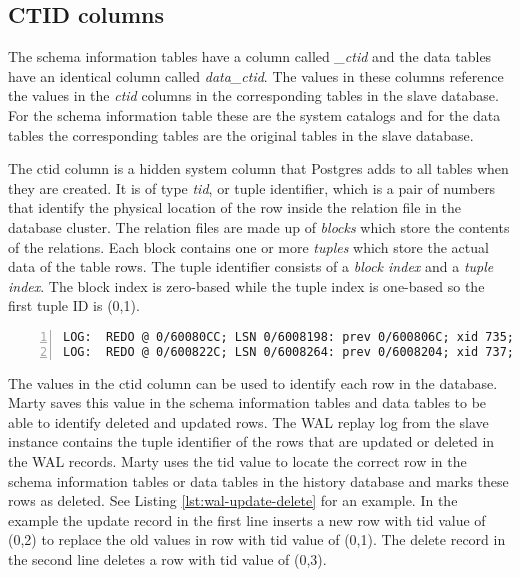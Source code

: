 \subsection{CTID columns}
\label{ch:implementation-history-ctid}
The schema information tables have a column called \textit{\_ctid} and the data tables have an identical column called \textit{data\_ctid}.
The values in these columns reference the values in the \textit{ctid} columns in the corresponding tables in the slave database.
For the schema information table these are the system catalogs and for the data tables the corresponding tables are the original tables in the slave database.

The ctid column is a hidden system column that Postgres adds to all tables when they are created.
It is of type \textit{tid}, or tuple identifier, which is a pair of numbers that identify the physical location of the row inside the relation file in the database cluster.
The relation files are made up of \textit{blocks} which store the contents of the relations.
Each block contains one or more \textit{tuples} which store the actual data of the table rows.
The tuple identifier consists of a \textit{block index} and a \textit{tuple index}.
The block index is zero-based while the tuple index is one-based so the first tuple ID is (0,1).

\begin{lstlisting}[caption={WAL update and delete example},label={lst:wal-update-delete},numbers=left,xleftmargin=2em]
LOG:  REDO @ 0/60080CC; LSN 0/6008198: prev 0/600806C; xid 735; len 37; bkpb0: Heap - update: rel 1663/16384/16385; tid 0/1 xmax 735 ; new tid 0/2 xmax 0
LOG:  REDO @ 0/600822C; LSN 0/6008264: prev 0/6008204; xid 737; len 26: Heap - delete: rel 1663/16384/16385; tid 0/3 KEYS_UPDATED
\end{lstlisting}

The values in the ctid column can be used to identify each row in the database.
Marty saves this value in the schema information tables and data tables to be able to identify deleted and updated rows.
The WAL replay log from the slave instance contains the tuple identifier of the rows that are updated or deleted in the WAL records.
Marty uses the tid value to locate the correct row in the schema information tables or data tables in the history database and marks these rows as deleted.
See Listing \ref{lst:wal-update-delete} for an example.
In the example the update record in the first line inserts a new row with tid value of (0,2) to replace the old values in row with tid value of (0,1).
The delete record in the second line deletes a row with tid value of (0,3).

